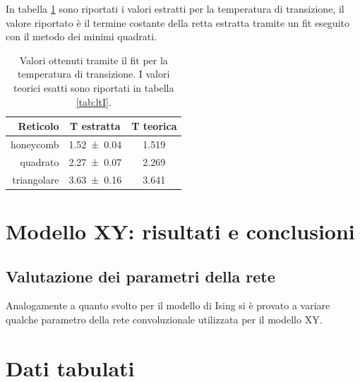 \documentclass{article}
\begin{document}
In tabella \ref{tab:Tising} sono riportati i valori estratti per la temperatura di transizione, il valore riportato è il termine costante della retta estratta tramite un fit eseguito con il metodo dei minimi quadrati.

\begin{table}[ht]
\begin{center}
\begin{tabular}{rcc}
\toprule
Reticolo & T estratta & T teorica \\
\midrule
honeycomb & \num{1.52 \pm 0.04} & \num{1.519} \\
quadrato & \num{2.27 \pm 0.07} & \num{2.269} \\
triangolare & \num{3.63 \pm 0.16} & \num{3.641} \\
\bottomrule
\end{tabular}
\end{center}
\caption{Valori ottenuti tramite il fit per la temperatura di transizione. I valori teorici esatti sono riportati in tabella \ref{tab:ltI}.}
\label{tab:Tising}
\end{table}


\section{Modello XY: risultati e conclusioni}
\subsection{Valutazione dei parametri della rete}
Analogamente a quanto svolto per il modello di Ising si è provato a variare qualche parametro della rete convoluzionale utilizzata per il modello XY.

\appendix

\section{Dati tabulati}







\end{document}
